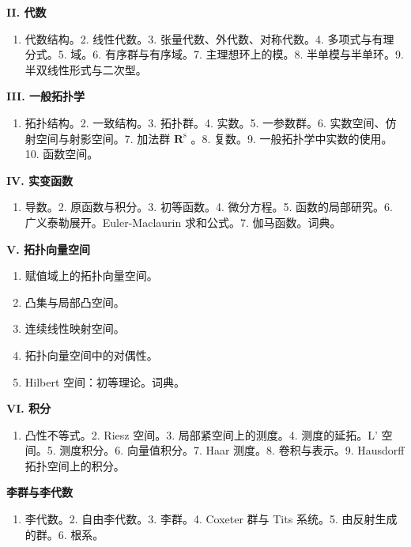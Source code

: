 \documentclass[UTF8,fontset=fandol,12pt,a4paper,oneside]{ctexbook}
\providecommand{\tightlist}{\setlength{\itemsep}{0pt}\setlength{\parskip}{0pt}}
\begin{document}
\textbf{II. 代数}

\begin{enumerate}
\def\labelenumi{\arabic{enumi}.}
\tightlist
\item
  代数结构。2. 线性代数。3. 张量代数、外代数、对称代数。4. 多项式与有理分式。5. 域。6. 有序群与有序域。7. 主理想环上的模。8. 半单模与半单环。9. 半双线性形式与二次型。
\end{enumerate}

\textbf{III. 一般拓扑学}

\begin{enumerate}
\def\labelenumi{\arabic{enumi}.}
\tightlist
\item
  拓扑结构。2. 一致结构。3. 拓扑群。4. 实数。5. 一参数群。6. 实数空间、仿射空间与射影空间。7. 加法群 \(\mathbf{R}^{\mathrm{s}}\) 。8. 复数。9. 一般拓扑学中实数的使用。10. 函数空间。
\end{enumerate}

\textbf{IV. 实变函数}

\begin{enumerate}
\def\labelenumi{\arabic{enumi}.}
\tightlist
\item
  导数。2. 原函数与积分。3. 初等函数。4. 微分方程。5. 函数的局部研究。6. 广义泰勒展开。Euler-Maclaurin 求和公式。7. 伽马函数。词典。
\end{enumerate}

\textbf{V. 拓扑向量空间}

\begin{enumerate}
\def\labelenumi{\arabic{enumi}.}
\tightlist
\item
  赋值域上的拓扑向量空间。
\item
  凸集与局部凸空间。
\item
  连续线性映射空间。
\item
  拓扑向量空间中的对偶性。
\item
  Hilbert 空间：初等理论。词典。
\end{enumerate}

\textbf{VI. 积分}

\begin{enumerate}
\def\labelenumi{\arabic{enumi}.}
\tightlist
\item
  凸性不等式。2. Riesz 空间。3. 局部紧空间上的测度。4. 测度的延拓。L' 空间。5. 测度积分。6. 向量值积分。7. Haar 测度。8. 卷积与表示。9. Hausdorff 拓扑空间上的积分。
\end{enumerate}


\textbf{李群与李代数}

\begin{enumerate}
\def\labelenumi{\arabic{enumi}.}
\tightlist
\item
  李代数。2. 自由李代数。3. 李群。4. Coxeter 群与 Tits 系统。5. 由反射生成的群。6. 根系。
\end{enumerate}
\end{document}
